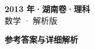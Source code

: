 \documentclass[zihao=-4, a4paper]{ctexart}
\begin{document}
\begin{center}
  {\Large\bfseries 2013 年·湖南卷·理科}\\[4pt]
  {\large 数学 · 解析版}
\end{center}
\medskip
{}

\clearpage
{}
\begin{center}{\Large\bfseries 参考答案与详细解析}\end{center}
\medskip

\end{document}
